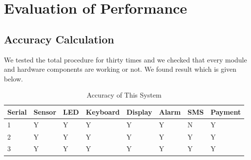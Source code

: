 \section{Evaluation of Performance}


\subsection{Accuracy Calculation}
We tested the total procedure for thirty times and we checked that every module and hardware components are working or not. We found result which is given below.
\begin{table}[H]
\centering
\caption{Accuracy of This System}
\begin{tabular}{|l|l|l|l|l|l|l|l|}
\hline
\textbf{Serial} & \textbf{Sensor}                                                & \textbf{LED}                                                   & \textbf{Keyboard}                                             & \textbf{Display}                                               & \textbf{Alarm}                                                & \textbf{SMS}                                                  & \textbf{Payment}                                              \\ \hline
1               & Y                                                              & Y                                                              & Y                                                             & Y                                                              & Y                                                             & N                                                             & Y                                                             \\ \hline
2               & Y                                                              & Y                                                              & Y                                                             & Y                                                              & Y                                                             & Y                                                             & Y                                                             \\ \hline
3               & Y                                                              & Y                                                              & Y                                                             & Y                                                              & Y                                                             & Y                                                             & Y                                                             \\ \hline

\end{tabular}
\end{table}
